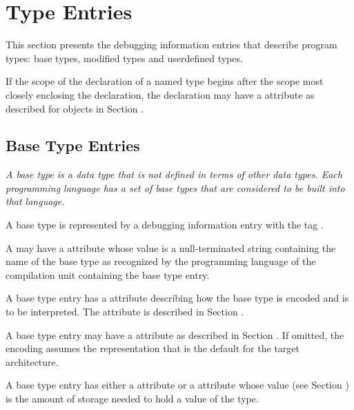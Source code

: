 \chapter{Type Entries}
\label{chap:typeentries}
This section presents the debugging information entries
that describe program types: base types, modified types and
user\dash defined types.

If the scope of the declaration of a named type begins 
after\hypertarget{chap:DWATstartscopetypedeclaration}{}
\bbeb 
the scope most closely enclosing the
declaration, the declaration may have a 
\DWATstartscopeDEFN{} attribute as described for objects in 
Section .

\section{Base Type Entries}
\label{chap:basetypeentries}

\textit{A base type is a data type that is not defined in terms of
other data types. 
Each programming language has a set of base
types that are considered to be built into that language.}

A base type is represented by a debugging information entry
with the tag \DWTAGbasetypeTARG.

A 
may have a \DWATname{} attribute
whose value is
a null-terminated string containing the name of the base type
as recognized by the programming language of the compilation
unit containing the base type entry.

A base type entry has 
a \DWATencoding{} attribute describing
how the base type is encoded and is to be interpreted. 
The \DWATencoding{} attribute is described in
Section .

A base type entry
may have a \DWATendianity{} attribute
as described in 
Section . 
If omitted, the encoding assumes the representation that
is the default for the target architecture.

A base type entry has either a
\DWATbytesize{}\hypertarget{chap:DWATbytesizedataobjectordatatypesize}{}
attribute or a
\DWATbitsize{}\hypertarget{chap:DWATbitsizebasetypebitsize}{} 
attribute whose  value
(see Section ) 
is the amount of storage needed to hold
a value of the type.

